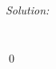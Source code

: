\documentclass[12pt,a4paper]{article}
\newenvironment{sol}
    {\emph{Solution:}
    }
    {
    \qed
    }
\begin{document}
\begin{sol}
\begin{itemize}
\begin{gather}
\begin{align}

\end{align}
\end{gather}
\end{itemize}
\end{sol}
\end{document}
